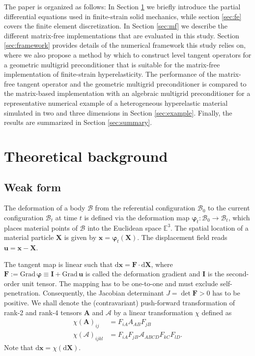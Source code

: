 \documentclass[AMA,STIX1COL]{WileyNJD-v2}
\newcommand*{\gz}[1]{\boldsymbol{#1}}
\newcommand*{\Grad}{\mathrm{Grad}}
\renewcommand*{\d}{\mathrm{d}}
\newcommand*{\mcl}[1]{\mathcal{#1}}
\begin{document}
The paper is organized as follows:
In Section \ref{sec:theory} we briefly introduce the partial differential equations used in finite-strain solid mechanics,
while section \ref{sec:fe} covers the finite element discretization.
In Section \ref{sec:mf} we describe the different matrix-free implementations that are evaluated in this study.
Section \ref{sec:framework} provides details of the numerical framework this study relies on,
where we also propose a method by which to construct level tangent operators for
a geometric multigrid preconditioner that is suitable for the matrix-free implementation of finite-strain hyperelasticity.
%
The performance of the matrix-free tangent operator and the geometric multigrid preconditioner is compared to the matrix-based implementation with
an algebraic multigrid preconditioner for a representative numerical example of a heterogeneous hyperelastic material simulated in two and three dimensions in Section \ref{sec:example}.
Finally, the results are summarized in Section \ref{sec:summary}.

\section{Theoretical background}
\label{sec:theory}

\subsection{Weak form}
The deformation of a body $\mcl B$ from the referential configuration $\mcl B_0$ to the current configuration $\mcl B_t$ at time $t$
is defined via the deformation map $\gz \varphi_t: \mcl B_0 \rightarrow \mcl B_t$, which places material points of $\mcl B$ into the Euclidean space $\mathbb E^3$.
The spatial location of a material particle $\gz X$ is given by $\gz x = \gz \varphi_t (\gz X)$.
The displacement field reads $\gz u = \gz x - \gz X$.

The tangent map is linear such that
$\d \gz x = \gz F \cdot \d \gz X$,
where $\gz F := \Grad \, \gz \varphi \equiv \gz I + \Grad \, \gz u$ is called the deformation gradient and $\gz I$ is the second-order unit tensor.
The mapping has to be one-to-one and must exclude self-penetration. Consequently, the Jacobian determinant $J = \det \gz F > 0$ has to be positive.
We shall denote the (contravariant) push-forward transformation of rank-2 and rank-4 tensors $\mathbf{A}$ and $\boldsymbol{\mathcal{A}}$ by a linear transformation $\chi$ defined as
\begin{align}
  \chi\left( \mathbf{A} \right)_{ij}
  &= F_{iA} A_{AB} F_{jB} \\
  \chi\left( \boldsymbol{\mathcal{A}} \right)_{ijkl}
  &= F_{iA} F_{jB} \mathcal{A}_{ABCD} F_{kC} F_{lD}.
\end{align}
Note that $\d \gz x = \chi(\d \gz X)$.
\end{document}
